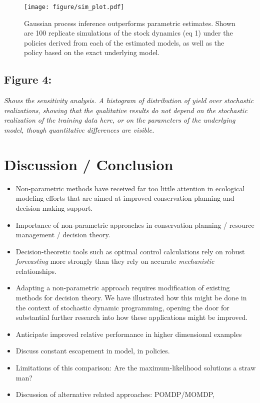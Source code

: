 \documentclass[author-year, review]{elsarticle} %
\begin{document}
\begin{figure}[htbp]
\centering
\texttt{[image: figure/sim\_plot.pdf]}
\caption{Gaussian process inference outperforms parametric estimates.
Shown are 100 replicate simulations of the stock dynamics (eq 1) under
the policies derived from each of the estimated models, as well as the
policy based on the exact underlying model.}
\end{figure}

\subsection{Figure 4:}

\emph{Shows the sensitivity analysis. A histogram of distribution of
yield over stochastic realizations, showing that the qualitative results
do not depend on the stochastic realization of the training data here,
or on the parameters of the underlying model, though quantitative
differences are visible.}

\section{Discussion / Conclusion}

\begin{itemize}
\item
  Non-parametric methods have received far too little attention in
  ecological modeling efforts that are aimed at improved conservation
  planning and decision making support.
\item
  Importance of non-parametric approaches in conservation planning /
  resource management / decision theory.
\item
  Decision-theoretic tools such as optimal control calculations rely on
  robust \emph{forecasting} more strongly than they rely on accurate
  \emph{mechanistic} relationships.
\item
  Adapting a non-parametric approach requires modification of existing
  methods for decision theory. We have illustrated how this might be
  done in the context of stochastic dynamic programming, opening the
  door for substantial further research into how these applications
  might be improved.
\item
  Anticipate improved relative performance in higher dimensional
  examples
\item
  Discuss constant escapement in model, in policies.
\item
  Limitations of this comparison: Are the maximum-likelihood solutions a
  straw man?
\item
  Discussion of alternative related approaches: POMDP/MOMDP,
\end{itemize}
\end{document}
